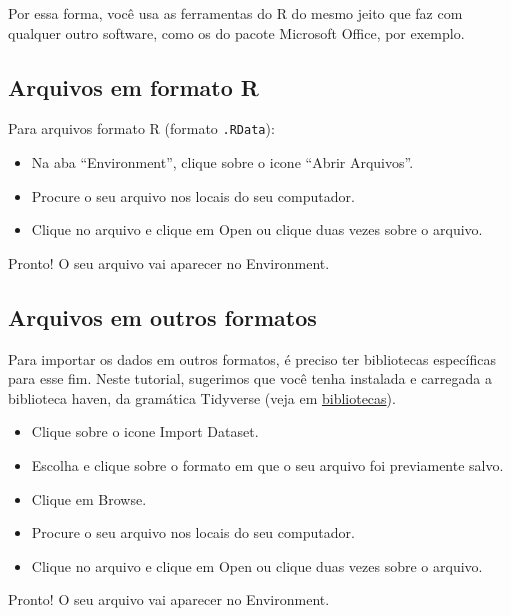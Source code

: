 \documentclass[
  10pt,
  brazil,
  a4paper,
  twoside, notitlepage, openright]{book}
\providecommand{\tightlist}{%
  \setlength{\itemsep}{0pt}\setlength{\parskip}{0pt}}
\begin{document}
Por essa forma, você usa as ferramentas do R do mesmo jeito que faz com qualquer outro software, como os do pacote Microsoft Office, por exemplo.

\hypertarget{arquivos-em-formato-r}{%
\subsection{Arquivos em formato R}\label{arquivos-em-formato-r}}

Para arquivos formato R (formato \texttt{.RData}):

\begin{itemize}
\tightlist
\item
  Na aba ``Environment'', clique sobre o icone ``Abrir Arquivos''.\\
\item
  Procure o seu arquivo nos locais do seu computador.\\
\item
  Clique no arquivo e clique em Open ou clique duas vezes sobre o arquivo.
\end{itemize}

Pronto! O seu arquivo vai aparecer no Environment.

\hypertarget{arquivos-em-outros-formatos}{%
\subsection{Arquivos em outros formatos}\label{arquivos-em-outros-formatos}}

Para importar os dados em outros formatos, é preciso ter bibliotecas específicas para esse fim. Neste tutorial, sugerimos que você tenha instalada e carregada a biblioteca haven, da gramática Tidyverse (veja em \protect\hyperlink{biblio}{bibliotecas}).

\begin{itemize}
\tightlist
\item
  Clique sobre o icone Import Dataset.
\item
  Escolha e clique sobre o formato em que o seu arquivo foi previamente salvo.
\item
  Clique em Browse.
\item
  Procure o seu arquivo nos locais do seu computador.
\item
  Clique no arquivo e clique em Open ou clique duas vezes sobre o arquivo.
\end{itemize}

Pronto! O seu arquivo vai aparecer no Environment.
\end{document}
